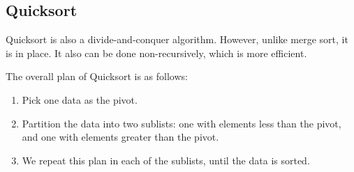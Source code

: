 \subsection{Quicksort}
Quicksort is also a divide-and-conquer algorithm. However, unlike merge sort, it is in place. It also can be done non-recursively, which is more efficient.

The overall plan of Quicksort is as follows:
\begin{enumerate}
	\item Pick one data as the pivot.
	\item Partition the data into two sublists: one with elements less than the pivot, and one with elements greater than the pivot.
	\item We repeat this plan in each of the sublists, until the data is sorted.
\end{enumerate}


